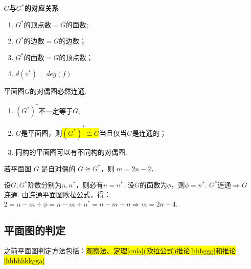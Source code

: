 \noindent \textcolor{ecolor}{\bfseries $G$与$G^{*}$的对应关系}
\begin{enumerate}
	\item $G^{*}$的顶点数$=G$的面数;
	\item $G^{*}$的边数$=G$的边数；
	\item $G^{*}$的面数$=G$的顶点数；
	\item $d(v^{*})=deg(f)$
\end{enumerate}
\begin{theorem}
平面图$G$的对偶图必然连通.
\end{theorem}
\begin{note}
	\begin{enumerate}
		\item $(G ^{*})^{*}$不一定等于$G$;
		\item $G$是平面图，则\colorbox{yellow}{$(G ^{*})^{*}\cong G$}当且仅当$G$是连通的；
		\item 同构的平面图可以有不同构的对偶图.
	\end{enumerate}
\end{note}
\begin{example}
	若平面图 $G$ 是自对偶的 $G\cong G ^{*}$，则 $m=2n-2$．
	
	\noindent {\bfseries\songti \textcolor{ecolor}{解：}} 设$G, G ^{*}$阶数分别为$n, n^{*}$，则必有$n=n^{*}$. 设$G$的面数为$\phi$，则$\phi=n^{*}$. $G ^{*}$连通$\Rightarrow G$连通. 由连通平面图欧拉公式，得：$2=n-m+\phi = n-m+n^{*}=n-m+n\Rightarrow m=2n-4$.
\end{example}




\subsection{平面图的判定}
之前平面图判定方法包括：\colorbox{yellow}{观察法、定理\ref{oula}(欧拉公式)推论\ref{hhbggg}和推论\ref{hhhhhkkgga}}


